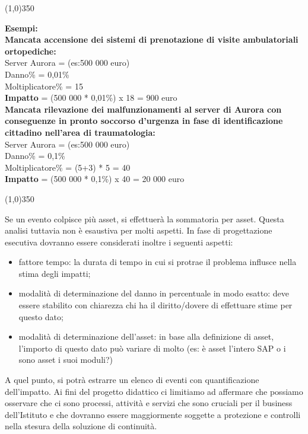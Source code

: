 \begin{center}
	\line(1,0){350}
\end{center}
\begin{changemargin}{0.5cm}{0.5cm}
  \textbf{Esempi:}
  \vspace{0.2cm}\\
  \textbf{Mancata accensione dei sistemi di prenotazione di visite ambulatoriali ortopediche:}\\
  Server Aurora = (es:500 000 euro) \\
  Danno\% = 0,01\% \\
  Moltiplicatore\% = 15 \\
  \textbf{Impatto} = (500 000 * 0,01\%) x 18 = 900 euro
  \vspace{0.2cm} \\
  \textbf{Mancata rilevazione dei malfunzionamenti al server di Aurora con conseguenze in pronto soccorso d'urgenza in fase di identificazione cittadino nell'area di traumatologia:}\\
  Server Aurora = (es:500 000 euro) \\
  Danno\% = 0,1\% \\
  Moltiplicatore\% = (5+3) * 5 = 40 \\
  \textbf{Impatto} = (500 000 * 0,1\%) x 40 = 20 000 euro
\end{changemargin}
\begin{center}
	\line(1,0){350}
\end{center}
Se un evento colpisce più asset, si effettuerà la sommatoria per asset. Questa analisi tuttavia non è esaustiva per molti aspetti. In fase di progettazione esecutiva dovranno essere considerati inoltre i seguenti aspetti:
\begin{itemize}
\item fattore tempo: la durata di tempo in cui si protrae il problema influsce nella stima degli impatti;
\item modalità di determinazione del danno in percentuale in modo esatto: deve essere stabilito con chiarezza chi ha il diritto/dovere di effettuare stime per questo dato;
\item modalità di determinazione dell'asset: in base alla definizione di asset, l'importo di questo dato può variare di molto (es: è asset l'intero SAP o i sono asset i suoi moduli?)
\end{itemize}
\vspace{1cm}
A quel punto, si potrà estrarre un elenco di eventi con quantificazione dell'impatto. Ai fini del progetto didattico ci limitiamo ad affermare che possiamo osservare che ci sono processi, attività e servizi che sono cruciali per il business dell'Istituto e che dovranno essere maggiormente soggette a protezione e controlli nella stesura della soluzione di continuità.

